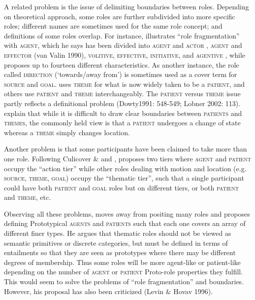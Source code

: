\documentclass[output=paper]{langsci/langscibook}
\begin{document}
A related problem is the issue of delimiting boundaries between roles. Depending on theoretical approach, some roles are further subdivided into more specific roles; different names are sometimes used for the same role concept; and definitions of some roles overlap. For instance, \citet[553]{Dowty1991} illustrates “role fragmentation” with \textsc{agent,} which he says has been divided into \textsc{agent} and \textsc{actor} \citep{Jackendoff1983}, \textsc{agent} and \textsc{effector} (van Valin 1990), \textsc{volitive}, \textsc{effective}, \textsc{initiative}, and \textsc{agentive} \citep{Cruse1973}, while \citet{Lakoff1977} proposes up to fourteen different characteristics. As another instance, the role called \textsc{direction} (‘towards/away from’) is sometimes used as a cover term for \textsc{source} and \textsc{goal. }\citet{Anderson1977} uses \textsc{theme} for what is now widely taken to be a \textsc{patient}, and others use \textsc{patient} and \textsc{theme} interchangeably. The \textsc{patient} versus \textsc{theme} issue partly reflects a definitional problem (Dowty\textit {}1991: 548-549; Lobner 2002: 113). \citet[5]{PalmerEtAl2010} explain that while it is difficult to draw clear boundaries between \textsc{patients} and \textsc{themes,} the commonly held view is that a \textsc{patient} undergoes a change of state whereas a \textsc{theme} simply changes location.

Another problem is that some participants have been claimed to take more than one role. Following Culicover \& \citet{Wilkins1986} and \citet{Talmy1985}, \citet[395]{Jackendoff1987} proposes two tiers where \textsc{agent} and \textsc{patient} occupy the “action tier” while other roles dealing with motion and location (e.g. \textsc{source, theme, goal}) occupy the “thematic tier”, such that a single participant could have both \textsc{patient} and \textsc{goal} roles but on different tiers, or both \textsc{patient} and \textsc{theme}, etc.

 Observing all these problems, \citet{Dowty1991} moves away from positing many roles and proposes defining Prototypical \textsc{agents} and \textsc{patient}\textsc{s} such that each one covers an array of different finer types. He argues that thematic roles should not be viewed as semantic primitives or discrete categories, but must be defined in terms of entailments so that they are seen as prototypes where there may be different degrees of membership. Thus some roles will be more agent-like or patient-like depending on the number of \textsc{agent} or \textsc{patient} Proto-role properties they fulfill. This would seem to solve the problems of “role fragmentation” and boundaries. However, his proposal has also been criticized (Levin \& Hovav 1996).
\end{document}
